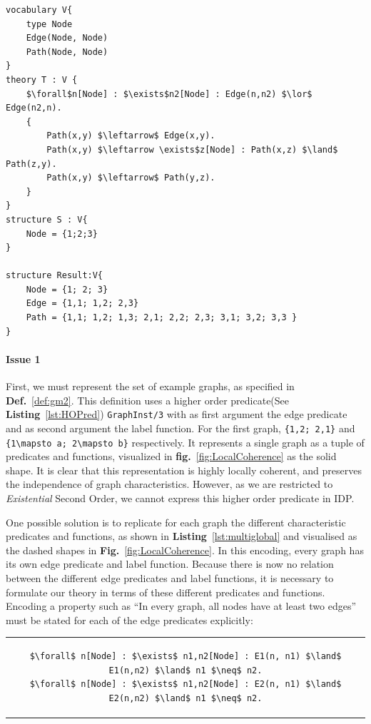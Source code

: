 \begin{lstlisting}[mathescape,style=model,caption=\ldots, label=lst:vocabularyExample]
vocabulary V{
    type Node
    Edge(Node, Node)
    Path(Node, Node)
}
theory T : V {
    $\forall$n[Node] : $\exists$n2[Node] : Edge(n,n2) $\lor$ Edge(n2,n).
    {
        Path(x,y) $\leftarrow$ Edge(x,y).
        Path(x,y) $\leftarrow \exists$z[Node] : Path(x,z) $\land$ Path(z,y).
        Path(x,y) $\leftarrow$ Path(y,z).
    }
}
structure S : V{
    Node = {1;2;3}
}

structure Result:V{
    Node = {1; 2; 3}
    Edge = {1,1; 1,2; 2,3}
    Path = {1,1; 1,2; 1,3; 2,1; 2,2; 2,3; 3,1; 3,2; 3,3 }
}
\end{lstlisting}


\paragraph{Issue 1}
First, we must represent the set of example graphs, as specified in \textbf{Def.}~\ref{def:gm2}. 
This definition uses a higher order predicate(See \textbf{Listing}~\ref{lst:HOPred}) \lstinline{GraphInst/3} with as first argument the edge predicate and as second argument the label function. For the first graph, \lstinline|{1,2; 2,1}| and \lstinline|{1\mapsto a; 2\mapsto b}| respectively. 
It represents a single graph as a tuple of predicates and functions, visualized in \textbf{fig.}~\ref{fig:LocalCoherence} as the solid shape.
It is clear that this representation is highly locally coherent, and preserves the independence of graph characteristics.
However, as we are restricted to \emph{Existential} Second Order, we cannot express this higher order predicate in IDP.

One possible solution is to replicate for each graph the different characteristic predicates and functions, as shown
in \textbf{Listing}~\ref{lst:multiglobal} and visualised as the dashed shapes in \textbf{Fig.}~\ref{fig:LocalCoherence}.
In this encoding, every graph has its own edge predicate and label function. 
Because there is now no relation between the different edge predicates and label functions, it is necessary to formulate our theory in terms of these different predicates and functions.
Encoding a property such as ``In every graph, all nodes have at least two  edges'' must be stated for each of the edge predicates explicitly:
\begin{center}
\begin{tabular}{c}
\begin{lstlisting}[mathescape]
$\forall$ n[Node] : $\exists$ n1,n2[Node] : E1(n, n1) $\land$ E1(n,n2) $\land$ n1 $\neq$ n2.
$\forall$ n[Node] : $\exists$ n1,n2[Node] : E2(n, n1) $\land$ E2(n,n2) $\land$ n1 $\neq$ n2.
\end{lstlisting}
\end{tabular}
\end{center}

